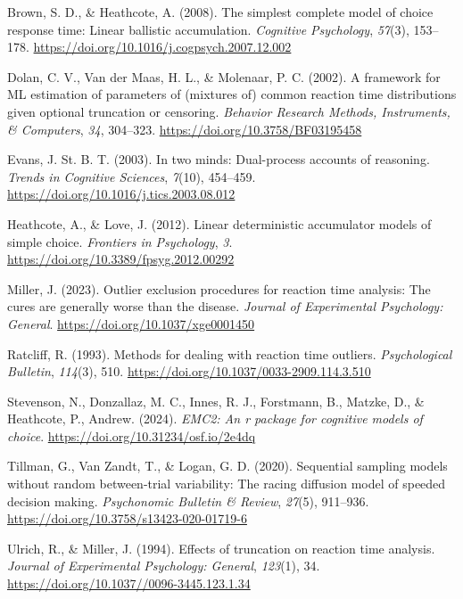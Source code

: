 \documentclass[
  stu,
  floatsintext,
  longtable,
  nolmodern,
  notxfonts,
  notimes,
  draftfirst,
  colorlinks=true,linkcolor=blue,citecolor=blue,urlcolor=blue]{apa7}
\newlength{\cslhangindent}
\newenvironment{CSLReferences}[2] %
 {\begin{list}{}{%
  \setlength{\itemindent}{0pt}
  \setlength{\leftmargin}{0pt}
  \setlength{\parsep}{0pt}
  \ifodd #1
   \setlength{\leftmargin}{\cslhangindent}
   \setlength{\itemindent}{-1\cslhangindent}
  \fi
  \setlength{\itemsep}{#2\baselineskip}}}
 {\end{list}}
\begin{document}
\label{refs}
\begin{CSLReferences}{1}{0}
Brown, S. D., \& Heathcote, A. (2008). The simplest complete model of
choice response time: Linear ballistic accumulation. \emph{Cognitive
Psychology}, \emph{57}(3), 153--178.
\url{https://doi.org/10.1016/j.cogpsych.2007.12.002}

Dolan, C. V., Van der Maas, H. L., \& Molenaar, P. C. (2002). A
framework for ML estimation of parameters of (mixtures of) common
reaction time distributions given optional truncation or censoring.
\emph{Behavior Research Methods, Instruments, \& Computers}, \emph{34},
304--323. \url{https://doi.org/10.3758/BF03195458}

Evans, J. St. B. T. (2003). In two minds: Dual-process accounts of
reasoning. \emph{Trends in Cognitive Sciences}, \emph{7}(10), 454--459.
\url{https://doi.org/10.1016/j.tics.2003.08.012}

Heathcote, A., \& Love, J. (2012). Linear deterministic accumulator
models of simple choice. \emph{Frontiers in Psychology}, \emph{3}.
\url{https://doi.org/10.3389/fpsyg.2012.00292}

Miller, J. (2023). Outlier exclusion procedures for reaction time
analysis: The cures are generally worse than the disease. \emph{Journal
of Experimental Psychology: General}.
\url{https://doi.org/10.1037/xge0001450}

Ratcliff, R. (1993). Methods for dealing with reaction time outliers.
\emph{Psychological Bulletin}, \emph{114}(3), 510.
\url{https://doi.org/10.1037/0033-2909.114.3.510}

Stevenson, N., Donzallaz, M. C., Innes, R. J., Forstmann, B., Matzke,
D., \& Heathcote, P., Andrew. (2024). \emph{EMC2: An r package for
cognitive models of choice}. \url{https://doi.org/10.31234/osf.io/2e4dq}

Tillman, G., Van Zandt, T., \& Logan, G. D. (2020). Sequential sampling
models without random between-trial variability: The racing diffusion
model of speeded decision making. \emph{Psychonomic Bulletin \& Review},
\emph{27}(5), 911--936. \url{https://doi.org/10.3758/s13423-020-01719-6}

Ulrich, R., \& Miller, J. (1994). Effects of truncation on reaction time
analysis. \emph{Journal of Experimental Psychology: General},
\emph{123}(1), 34. \url{https://doi.org/10.1037//0096-3445.123.1.34}

\end{CSLReferences}
\end{document}
